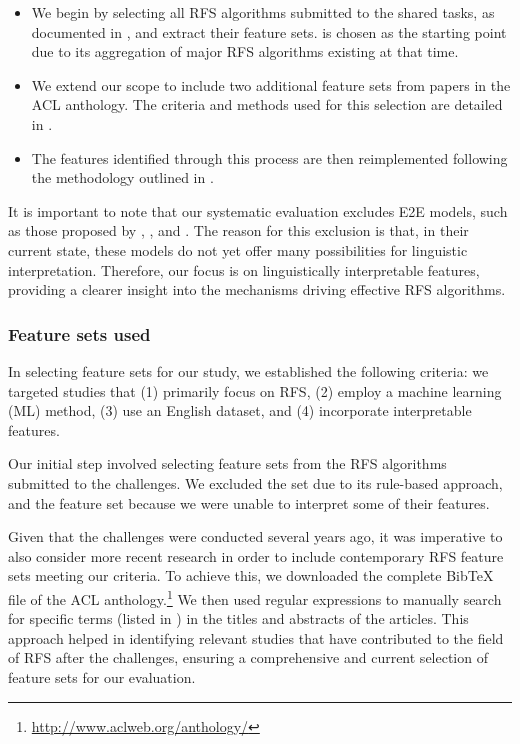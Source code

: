 \begin{itemize}
	
	\item We begin by selecting all RFS algorithms submitted to the \grec shared tasks, as documented in \citet{belz2010generating}, and extract their feature sets. \grec is chosen as the starting point due to its aggregation of major RFS algorithms existing at that time.
	
	\item We extend our scope to include two additional feature sets from papers in the ACL anthology. The criteria and methods used for this selection are detailed in .
	
	\item The features identified through this process are then reimplemented following the methodology outlined in .
	
\end{itemize}

It is important to note that our systematic evaluation excludes E2E models, such as those proposed by \citet{ferreira2018neuralreg}, \citet{cao2019referring}, and \citet{cunha-etal-2020-referring}. The reason for this exclusion is that, in their current state, these models do not yet offer many possibilities for linguistic interpretation. Therefore, our focus is on linguistically interpretable features, providing a clearer insight into the mechanisms driving effective RFS algorithms.

\subsubsection{Feature sets used}\label{subsec:featsets}

In selecting feature sets for our study, we established the following criteria: we targeted studies that (1) primarily focus on RFS, (2) employ a machine learning (ML) method, (3) use an English dataset, and (4) incorporate interpretable features.

Our initial step involved selecting feature sets from the RFS algorithms submitted to the \grec challenges. We excluded the  set \citep{gupta2009junlg} due to its rule-based approach, and the  feature set \citep{orasan-dornescu-2009-wlv} because we were unable to interpret some of their features.

Given that the \grec challenges were conducted several years ago, it was imperative to also consider more recent research in order to include contemporary RFS feature sets meeting our criteria. To achieve this, we downloaded the complete BibTeX file of the ACL anthology.\footnote{\url{http://www.aclweb.org/anthology/}} We then used regular expressions to manually search for specific terms (listed in ) in the titles and abstracts of the articles. This approach helped in identifying relevant studies that have contributed to the field of RFS after the \grec challenges, ensuring a comprehensive and current selection of feature sets for our evaluation.


